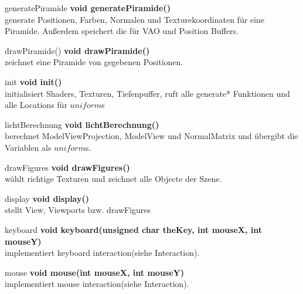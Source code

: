 \documentclass[12pt]{article}
\begin{document}
\begin{mybox}[colback=white]{generatePiramide}
\textbf{void generatePiramide()} \\
generate Positionen, Farben, Normalen und Texturekoordinaten für eine Piramide. 
Außerdem speichert die für VAO und Position Buffers.
\end{mybox}
\begin{mybox}[colback=white]{drawPiramide()}
\textbf{void drawPiramide()} \\
zeichnet eine Piramide von gegebenen Positionen.
\end{mybox}

\begin{mybox}[colback=white]{init}
\textbf{void init()} \\
initialisiert Shaders, Texturen, Tiefenpuffer, ruft alle generate* Funktionen und alle Locations für $uniform$s
\end{mybox}

\begin{mybox}[colback=white]{lichtBerechnung}
\textbf{void lichtBerechnung()} \\
berechnet ModelViewProjection, ModelView und NormalMatrix und übergibt die Variablen als $uniform$s.
\end{mybox}

\begin{mybox}[colback=white]{drawFigures}
\textbf{void drawFigures()} \\
wählt richtige Texturen und zeichnet alle Objecte der Szene.
\end{mybox}

\begin{mybox}[colback=white]{display}
\textbf{void display()} \\
stellt View, Viewports bzw. drawFigures
\end{mybox}

\begin{mybox}[colback=white]{keyboard}
\textbf{void keyboard(unsigned char theKey, int mouseX, int mouseY)} \\
implementiert keyboard interaction(siehe Interaction).
\end{mybox}

\begin{mybox}[colback=white]{mouse}
\textbf{void mouse(int mouseX, int mouseY)} \\
implementiert mouse interaction(siehe Interaction).
\end{mybox}

\pagebreak
\end{document}
